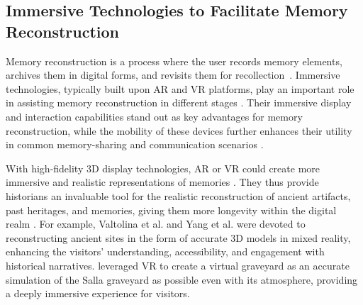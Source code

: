 








\subsection{Immersive Technologies to Facilitate Memory Reconstruction}
Memory reconstruction is a process where the user records memory elements, archives them in digital forms, and revisits them for recollection~\cite{pollio1971memory, crete2012reconstructing, maddali2023understanding}. 
Immersive technologies, typically built upon AR and VR platforms, play an important role in assisting memory reconstruction in different stages \cite{valtolina2005dissemination,10.1145/3610903,iriye2021memories}.
Their immersive display and interaction capabilities stand out as key advantages for memory reconstruction, while the mobility of these devices further enhances their utility in common memory-sharing and communication scenarios \cite{10.1145/3024969.3024996,kirk2010human}.



With high-fidelity 3D display technologies, AR or VR could create more immersive and realistic representations of memories \cite{lekan2016virtual,10.1145/3385956.3418945,krokos2019virtual}.
They thus provide historians an invaluable tool for the realistic reconstruction of ancient artifacts, past heritages, and memories, giving them more longevity within the digital realm \cite{tan2009virtual}.
For example, Valtolina et al. \cite{valtolina2005dissemination} and Yang et al. \cite{yang2006creating} were devoted to reconstructing ancient sites in the form of accurate 3D models in mixed reality, enhancing the visitors' understanding, accessibility, and engagement with historical narratives.
\citet{10.1145/3365610.3368425} leveraged VR to create a virtual graveyard as an accurate simulation of the Salla graveyard as possible even with its atmosphere, providing a deeply immersive experience for visitors.

